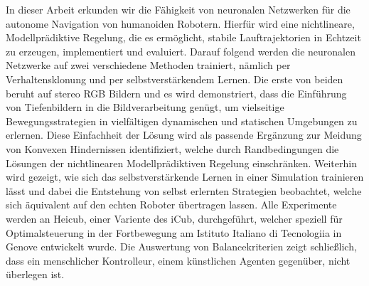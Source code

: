 In dieser Arbeit erkunden wir die Fähigkeit von neuronalen Netzwerken für die autonome Navigation von humanoiden Robotern. Hierfür wird eine nichtlineare, Modellprädiktive Regelung, die es ermöglicht, stabile Lauftrajektorien in Echtzeit zu erzeugen, implementiert und evaluiert. Darauf folgend werden die neuronalen Netzwerke auf zwei verschiedene Methoden trainiert, nämlich per Verhaltensklonung und per selbstverstärkendem Lernen. Die erste von beiden beruht auf stereo RGB Bildern und es wird demonstriert, dass die Einführung von Tiefenbildern in die Bildverarbeitung genügt, um vielseitige Bewegungsstrategien in vielfältigen dynamischen und statischen Umgebungen zu erlernen. Diese Einfachheit der Lösung wird als passende Ergänzung zur Meidung von Konvexen Hindernissen identifiziert, welche durch Randbedingungen die Lösungen der nichtlinearen Modellprädiktiven Regelung einschränken. Weiterhin wird gezeigt, wie sich das selbstverstärkende Lernen in einer Simulation trainieren lässt und dabei die Entstehung von selbst erlernten Strategien beobachtet, welche sich äquivalent auf den echten Roboter übertragen lassen. Alle Experimente werden an Heicub, einer Variente des iCub, durchgeführt, welcher speziell für Optimalsteuerung in der Fortbewegung am Istituto Italiano di Tecnologiia in Genove entwickelt wurde. Die Auswertung von Balancekriterien zeigt schließlich, dass ein menschlicher Kontrolleur, einem künstlichen Agenten gegenüber, nicht überlegen ist. 